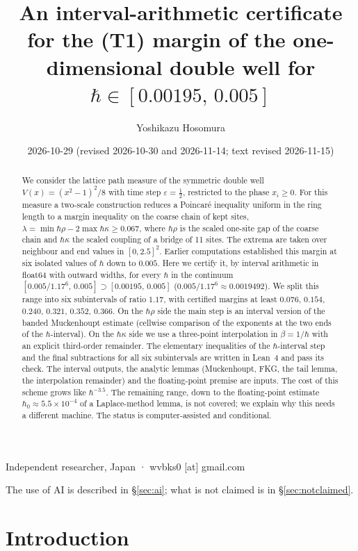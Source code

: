 \documentclass[11pt,a4paper]{article}
\title{An interval-arithmetic certificate for the (T1) margin of the one-dimensional double well for $\hbar\in[0.00195,\,0.005]$}
\author{Yoshikazu Hosomura}
\date{2026-10-29 (revised 2026-10-30 and 2026-11-14; text revised 2026-11-15)}
\theoremstyle{definition}
\theoremstyle{remark}
\newcommand{\hk}{\hbar\kappa}
\newcommand{\hr}{\hbar\rho}
\begin{document}
\maketitle
\begin{center}\small Independent researcher, Japan · wvbks0 [at] gmail.com\end{center}
\begin{center}\small The use of AI is described in \S\ref{sec:ai}; what is not claimed is in \S\ref{sec:notclaimed}.\end{center}

\begin{abstract}
We consider the lattice path measure of the symmetric double well $V(x)=(x^2-1)^2/8$ with time step $\varepsilon=\tfrac12$, restricted to the phase $x_i\ge0$. For this measure a two-scale construction reduces a Poincaré inequality uniform in the ring length to a margin inequality on the coarse chain of kept sites, $\lambda=\min\hr-2\max\hk\ge0.067$, where $\hr$ is the scaled one-site gap of the coarse chain and $\hk$ the scaled coupling of a bridge of 11 sites. The extrema are taken over neighbour and end values in $[0,2.5]^2$. Earlier computations established this margin at six isolated values of $\hbar$ down to $0.005$. Here we certify it, by interval arithmetic in float64 with outward widths, for every $\hbar$ in the continuum $[0.005/1.17^6,\,0.005]\supset[0.00195,\,0.005]$ ($0.005/1.17^6\approx0.0019492$). We split this range into six subintervals of ratio $1.17$, with certified margins at least $0.076$, $0.154$, $0.240$, $0.321$, $0.352$, $0.366$. On the $\hbar\rho$ side the main step is an interval version of the banded Muckenhoupt estimate (cellwise comparison of the exponents at the two ends of the $\hbar$-interval). On the $\hk$ side we use a three-point interpolation in $\beta=1/\hbar$ with an explicit third-order remainder. The elementary inequalities of the $\hbar$-interval step and the final subtractions for all six subintervals are written in Lean~4 and pass its check. The interval outputs, the analytic lemmas (Muckenhoupt, FKG, the tail lemma, the interpolation remainder) and the floating-point premise are inputs. The cost of this scheme grows like $\hbar^{-3.5}$. The remaining range, down to the floating-point estimate $\hbar_0\approx5.5\times10^{-4}$ of a Laplace-method lemma, is not covered; we explain why this needs a different machine. The status is computer-assisted and conditional.
\end{abstract}

\section{Introduction}\label{sec:intro}
\end{document}
